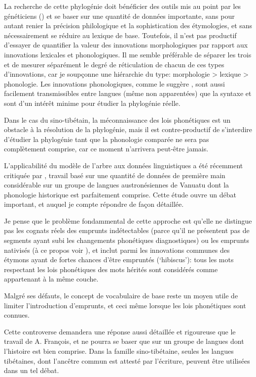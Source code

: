 \documentclass[oldfontcommands,oneside,a4paper,11pt]{memoir}
\begin{document}
	La recherche de cette phylogénie doit bénéficier des outils mis au point par les généticiens (\citealt{gray03ie}) et se baser sur une quantité de données importante, sans pour autant renier la précision philologique et la sophistication des étymologies, et sans nécessairement se réduire au lexique de base. Toutefois, il n'est pas productif d'essayer de quantifier la valeur des innovations morphologiques par rapport aux innovations lexicales et phonologiques. Il me semble préférable de séparer les trois et de mesurer séparément le degré de réticulation de chacun de ces types d'innovations, car je soupçonne une hiérarchie du type: morphologie > lexique > phonologie. Les innovations phonologiques, comme le suggère \citet{sagart04an-tk}, sont aussi facilement transmissibles entre langues (même non apparentées) que la syntaxe et sont d'un intérêt minime pour étudier la phylogénie réelle.
	
	Dans le cas du sino-tibétain, la méconnaissance des lois phonétiques est un obstacle à la résolution de la phylogénie, mais il est contre-productif de s'interdire d'étudier la phylogénie tant que la phonologie comparée ne sera pas complètement comprise, car ce moment n'arrivera peut-être jamais.
	
L'applicabilité du modèle de l'arbre aux données linguistiques a été récemment critiquée par \citet{francois15tree}, travail  basé sur une quantité de données de première main considérable sur un groupe de langues austronésiennes de Vanuatu dont la phonologie historique est parfaitement comprise. Cette étude ouvre un débat important, et auquel je compte répondre de façon détaillée. 

Je pense que le problème fondammental de cette approche est qu'elle ne distingue pas les cognats réels des emprunts indétectables (parce qu'il ne présentent pas de segments ayant subi les changements phonétiques diagnostiques) ou les emprunts nativisés (à ce propos voir \citealt{aikio06nativization}), et   inclut parmi les innovations communes des étymons ayant de fortes chances d'être empruntés (`hibiscus'): tous les mots respectant les lois phonétiques des mots hérités sont considérés comme appartenant à la même couche. 

Malgré ses défauts, le concept de vocabulaire de base reste un moyen utile de limiter l'introduction d'emprunts, et ceci même lorsque les lois phonétiques sont connues.

Cette controverse demandera une réponse aussi détaillée et rigoureuse que le travail de A. François, et ne pourra se baser que sur un groupe de langues dont l'histoire est bien comprise. Dans la famille sino-tibétaine, seules les langues tibétaines, dont l'ancêtre commun est attesté par l'écriture, peuvent être utilisées dans un tel débat.
	
\end{document}
